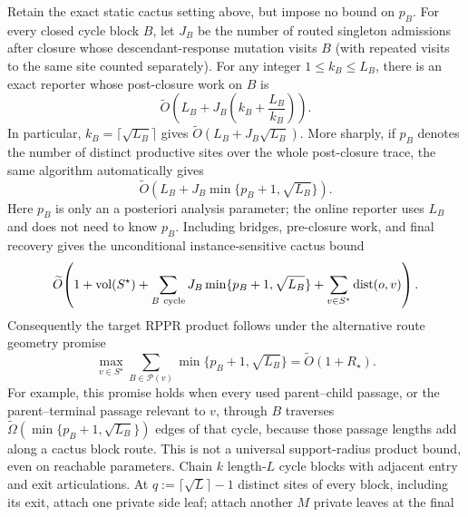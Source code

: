 \begin{corollary}
\label{cor:aesp-cd-cactus-productive-epochs}
Retain the exact static cactus setting above, but impose no bound on $p_B$.
For every closed cycle block $B$, let $J_B$ be the number of routed singleton
admissions after closure whose descendant-response mutation visits $B$ (with
repeated visits to the same site counted separately).  For any integer
$1\leq k_B\leq L_B$, there is an exact reporter whose post-closure work on
$B$ is
\begin{equation}
 \widetilde O\!\left(
   L_B+J_B\left(k_B+\frac{L_B}{k_B}\right)
 \right).
 \label{eq:aesp-cd-cactus-productive-epoch-work}
\end{equation}
In particular, $k_B=\lceil\sqrt{L_B}\rceil$ gives
$\widetilde O(L_B+J_B\sqrt{L_B})$.  More sharply, if $p_B$ denotes the
number of distinct productive sites over the whole post-closure trace, the
same algorithm automatically gives
\begin{equation}
 \widetilde O\!\left(
  L_B+J_B\min\{p_B+1,\sqrt{L_B}\}
 \right).
 \label{eq:aesp-cd-cactus-productive-hybrid-work}
\end{equation}
Here $p_B$ is only an a posteriori analysis parameter; the online reporter
uses $L_B$ and does not need to know $p_B$.
Including bridges, pre-closure work, and
final recovery gives the unconditional instance-sensitive cactus bound
\begin{equation*}
 \widetilde O\!\left(
  1+\operatorname{vol}(S^\star)+
  \sum_{B\ \mathrm{cycle}}J_B
       \min\{p_B+1,\sqrt{L_B}\}
 +\sum_{v\in S^\star}\operatorname{dist}(o,v)
 \right).
\end{equation*}
Consequently the target RPPR product follows under the alternative route
geometry promise
\begin{equation*}
 \max_{v\in S^\star}
 \sum_{B\in\mathcal P(v)}
       \min\{p_B+1,\sqrt{L_B}\}
 =\widetilde O(1+R_\star).
\end{equation*}
For example, this promise holds when every used parent--child passage, or the
parent--terminal passage relevant to $v$, through $B$ traverses
$\widetilde\Omega(\min\{p_B+1,\sqrt{L_B}\})$ edges of that cycle, because
those passage lengths add along a cactus block route.
This is not a universal support-radius product bound, even on reachable
parameters.  Chain $k$ length-$L$ cycle blocks with adjacent entry and exit
articulations.  At
$q:=\lceil\sqrt L\rceil-1$ distinct sites of every block, including its exit,
attach one private side leaf; attach another $M$ private leaves at the final

\end{corollary}
